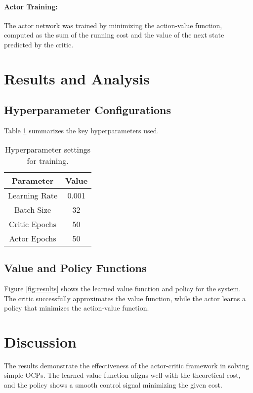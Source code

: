 \documentclass{article}
\begin{document}
\paragraph{Actor Training:}
The actor network was trained by minimizing the action-value function, computed as the sum of the running cost and the value of the next state predicted by the critic.

\section{Results and Analysis}

\subsection{Hyperparameter Configurations}
Table \ref{tab:hyperparameters} summarizes the key hyperparameters used.

\begin{table}[h!]
    \centering
    \begin{tabular}{|c|c|}
        \hline
        Parameter & Value \\
        \hline
        Learning Rate & 0.001 \\
        Batch Size & 32 \\
        Critic Epochs & 50 \\
        Actor Epochs & 50 \\
        \hline
    \end{tabular}
    \caption{Hyperparameter settings for training.}
    \label{tab:hyperparameters}
\end{table}

\subsection{Value and Policy Functions}
Figure \ref{fig:results} shows the learned value function and policy for the system. The critic successfully approximates the value function, while the actor learns a policy that minimizes the action-value function.


\section{Discussion}
The results demonstrate the effectiveness of the actor-critic framework in solving simple OCPs. The learned value function aligns well with the theoretical cost, and the policy shows a smooth control signal minimizing the given cost.
\end{document}
